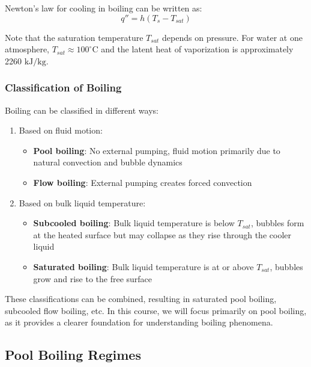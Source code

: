 Newton's law for cooling in boiling can be written as:
\[
q'' = h(T_s - T_{sat})
\]

Note that the saturation temperature $T_{sat}$ depends on pressure. For water at one atmosphere, $T_{sat} \approx 100^\circ \mathrm{C}$ and the latent heat of vaporization is approximately 2260 $\mathrm{kJ/kg}$.
\subsubsection*{Classification of Boiling}
Boiling can be classified in different ways:

\begin{enumerate}
    \item Based on fluid motion:
       \begin{itemize}
           \item \textbf{Pool boiling}: No external pumping, fluid motion primarily due to natural convection and bubble dynamics
           \item \textbf{Flow boiling}: External pumping creates forced convection
       \end{itemize}
    \item Based on bulk liquid temperature:
       \begin{itemize}
           \item \textbf{Subcooled boiling}: Bulk liquid temperature is below $T_{sat}$, bubbles form at the heated surface but may collapse as they rise through the cooler liquid
           \item \textbf{Saturated boiling}: Bulk liquid temperature is at or above $T_{sat}$, bubbles grow and rise to the free surface
       \end{itemize}
\end{enumerate}
%
These classifications can be combined, resulting in saturated pool boiling, subcooled flow boiling, etc. In this course, we will focus primarily on pool boiling, as it provides a clearer foundation for understanding boiling phenomena.
\subsection*{Pool Boiling Regimes}
